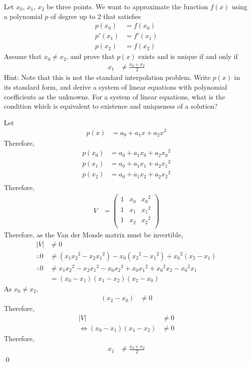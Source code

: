 \documentclass[fleqn, a4paper, 11pt, oneside]{amsart}
\theoremstyle{definition}
\theoremstyle{theorem}
\begin{document}
\begin{question}
	Let $x_0$, $x_1$, $x_2$ be three points.
	We want to approximate the function $f(x)$ using a polynomial $p$ of degree up to 2 that satisfies
	\begin{align*}
		p(x_0) &= f(x_0)\\
		p'(x_1) &= f'(x_1)\\
		p(x_2) &= f(x_2)
	\end{align*}
	Assume that $x_0 \neq x_2$, and prove that $p(x)$ exists and is unique if and only if
	\begin{align*}
		x_1 &\neq \frac{x_0 + x_2}{2}
	\end{align*}
	Hint: Note that this is not the standard interpolation problem.
	Write $p(x)$ in its standard form, and derive a system of linear equations with polynomial coefficients as the unknowns.
	For a system of linear equations, what is the condition which is equivalent to existence and uniqueness of a solution?
\end{question}

\begin{solution}
	Let
	\begin{align*}
		p(x) &= a_0 + a_1 x + a_2 x^2
	\end{align*}
	Therefore,
	\begin{align*}
		p(x_0) &= a_0 + a_1 x_0 + a_2 {x_0}^2\\
		p(x_1) &= a_0 + a_1 x_1 + a_2 {x_1}^2\\
		p(x_2) &= a_0 + a_1 x_2 + a_2 {x_2}^2\\
	\end{align*}
	Therefore,
	\begin{align*}
		V &=
			\begin{pmatrix}
				1 & x_0 & {x_0}^2\\
				1 & x_1 & {x_1}^2\\
				1 & x_2 & {x_2}^2\\
			\end{pmatrix}
	\end{align*}
	Therefore, as the Van der Monde matrix must be invertible,
	\begin{align*}
		|V| &\neq 0\\
		\therefore 0 &\neq \left( x_1 {x_2}^2 - x_2 {x_1}^2 \right) - x_0 \left( {x_2}^2 - {x_1}^2 \right) + {x_0}^2 (x_2 - x_1)\\
		\therefore 0 &\neq x_1 {x_2}^2 - x_2 {x_1}^2 - x_0 {x_2}^2 + x_0 {x_1}^2 + {x_0}^2 x_2 - {x_0}^2 x_1\\
		&= (x_0 - x_1) (x_1 - x_2) (x_2 - x_0)
	\end{align*}
	As $x_0 \neq x_2$,
	\begin{align*}
		(x_2 - x_0) &\neq 0
	\end{align*}
	Therefore,
	\begin{align*}
		|V| &\neq 0\\
		\iff (x_0 - x_1) (x_1 - x_2) &\neq 0
	\end{align*}
	Therefore,
	\begin{align*}
		x_1 &\neq \frac{x_0 + x_2}{2}
	\end{align*}
	\qed
\end{solution}
\end{document}
